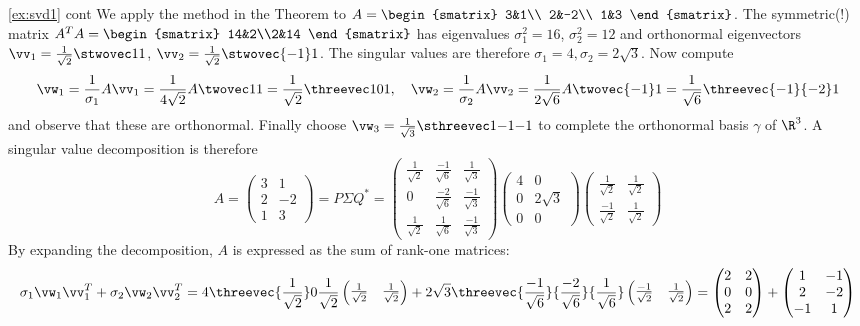 \begin{example*}{\ref{ex:svd1} cont}
We apply the method in the Theorem to $A=\begin{smatrix}
3&1\\
2&-2\\
1&3
\end{smatrix}$.\smallbreak
The symmetric(!) matrix $A^TA=\begin{smatrix}
	14&2\\2&14
  \end{smatrix}$ has eigenvalues $\sigma_1^2=16$, $\sigma_2^2=12$ and orthonormal eigenvectors $\vv_1=\frac 1{\sqrt 2}\stwovec 11$, $\vv_2=\frac 1{\sqrt 2}\stwovec{-1}1$. The singular values are therefore $\sigma_1=4,\sigma_2=2\sqrt 3$. Now compute
  \[\vw_1=\frac 1{\sigma_1}A\vv_1=\frac 1{4\sqrt 2}A\twovec 11=\frac 1{\sqrt 2}\threevec 101,\quad \vw_2=\frac 1{\sigma_2}A\vv_2 =\frac 1{2\sqrt 6}A\twovec{-1}1=\frac 1{\sqrt 6}\threevec{-1}{-2}1\]
  and observe that these are orthonormal. Finally choose $\vw_3=\frac 1{\sqrt 3}\sthreevec 1{-1}{-1}$ to complete the orthonormal basis $\gamma$ of $\R^3$. A singular value decomposition is therefore
  \[
  A=\begin{pmatrix}
  3&1\\2&-2\\1&3
  \end{pmatrix}=P\Sigma Q^*
  =\begin{pmatrix}
  \frac 1{\sqrt 2}&\frac{-1}{\sqrt 6}&\frac 1{\sqrt 3}\\
  0&\frac{-2}{\sqrt 6}&\frac{-1}{\sqrt 3}\\
  \frac 1{\sqrt 2}&\frac{1}{\sqrt 6}&\frac{-1}{\sqrt 3}  
  \end{pmatrix}
  \begin{pmatrix}
  4&0\\0&2\sqrt 3\\0&0
  \end{pmatrix}
  \begin{pmatrix}
  \frac 1{\sqrt 2}&\frac 1{\sqrt 2}\\\frac{-1}{\sqrt 2}&\frac 1{\sqrt 2}
  \end{pmatrix}
	\]
	By expanding the decomposition, $A$ is expressed as the sum of rank-one matrices:
	\[\sigma_1\vw_1\vv_1^T+\sigma_2\vw_2\vv_2^T =4\threevec{\frac 1{\sqrt 2}}0{\frac 1{\sqrt 2}}
	\begin{pmatrix}
	\frac 1{\sqrt 2}&\frac 1{\sqrt 2}
	\end{pmatrix}
	+
	2\sqrt 3\threevec{\frac{-1}{\sqrt 6}}{\frac{-2}{\sqrt 6}}{\frac{1}{\sqrt 6}}
	\begin{pmatrix}
	\frac{-1}{\sqrt 2}&\frac 1{\sqrt 2}
	\end{pmatrix}
  =\begin{pmatrix}
  2&2\\0&0\\2&2
  \end{pmatrix}
  +
  \begin{pmatrix}
  1&-1\\2&-2\\-1&1
  \end{pmatrix}\]
\end{example*}

